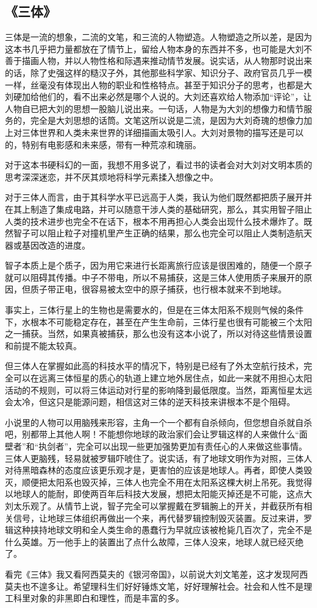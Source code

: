 \subsection{《三体》}
三体是一流的想象，二流的文笔，和三流的人物塑造。人物塑造之所以差，是因为这本书几乎把力量都放在了情节上，留给人物本身的东西并不多，也可能是大刘不善于描画人物，并以人物性格和际遇来推动情节发展。说实话，从人物那时说出来的话，除了史强这样的糙汉子外，其他那些科学家、知识分子、政府官员几乎一模一样，丝毫没有体现出人物的职业和性格特点。甚至于知识分子的思考，也都是大刘硬加给他们的，看不出来必然是哪个人说的。大刘还喜欢给人物添加“评论”，让人物自已把大刘的思想一股脑儿说出来。一句话，人物是为大刘的想像力和情节服务的，完全是大刘思想的话筒。文笔这所以说是二流，是因为大刘奇瑰的想像力加上对三体世界和人类未来世界的详细描画太吸引人。大刘对景物的描写还是可以的，特别有电影感和未来感，带有一种荒凉和瑰丽。

对于这本书硬科幻的一面，我想不用多说了，看过书的读者会对大刘对文明本质的思考深深迷恋，并不厌其烦地将科学元素揉入想像之中。

对于三体人而言，由于其科学水平已远高于人类，我认为他们既然都把质子展开并在其上制造了集成电路，并可以随意干涉人类的基础研究，那么，其实用智子阻止人类的技术进步也完全不在话下，根本不用再担心人类会出现什么技术爆炸了。既然智子可以阻止粒子对撞机里产生正确的结果，那么也完全可以阻止人类制造航天器或基因改造的进度。

智子本质上是个质子，因为用它来进行长距离旅行应该是很困难的，随便一个原子就可以阻碍其传播。中子不带电，所以不易捕获，这是三体人使用质子来展开的原因，但质子带正电，很容易被太空中的原子捕获，也行根本就来不到地球。

事实上，三体行星上的生物也是需要水的，但是在三体太阳系不规则气候的条件下，水根本不可能稳定存在，甚至在产生生命前，三体行星也很有可能被三个太阳之一捕获。当然，如果真被捕获，那么也没有这本小说了，所以对待这些情景设置和前提不能太较真。

但三体人在掌握如此高的科技水平的情况下，特别是已经有了外太空航行技术，完全可以在远离三体恒星的质心的轨道上建立地外居住点，如此一来就不用担心太阳活动的不规则，可以将三体运动对行星的影响降到最低限度。当然，距离恒星太远会太冷，但这只是能源问题，相信这对三体的逆天科技来讲根本不是个阻碍。

小说里的人物可以用脑残来形容，主角一个一个都有自杀倾向，但您想自杀就自杀吧，别都带上其他人啊！不能想你地球的政治家们会让罗辑这样的人来做什么“面壁者”和“执剑者”，完全可以出现一些更加强势更加有责任心的人来做这些事情。三体人更脑残，轻易就被罗辑吓唬住了。说实话，有了地球文明作为对照，三体人对待黑暗森林的态度应该更乐观才是，更害怕的应该是地球人。再者，即使人类毁灭，顺便把太阳系也毁灭掉，三体人也完全不用在太阳系这棵大树上吊死。我觉得以地球人的能耐，即使两百年后科技大发展，想把太阳能灭掉还是不可能，这点大刘太乐观了。从情节上说，智子完全可以掌握戴在罗辑腕上的开关，并截获所有相关信号，让地球三体组织再做出一个来，再代替罗辑控制毁灭装置。反过来讲，罗辑这种挟持地球文明和全人类生命的愚蠢行为早就应该被枪毙几百次了，完全不是什么英雄。万一他手上的装置出了点什么故障，三体人没来，地球人就已经灭绝了。

看完《三体》我又看阿西莫夫的《银河帝国》，以前说大刘文笔差，这才发现阿西莫夫也不遑多让。希望理科生们好好锤炼文笔，好好理解社会。社会和人性不是理工科里对象的非黑即白和理性，而是丰富的多。